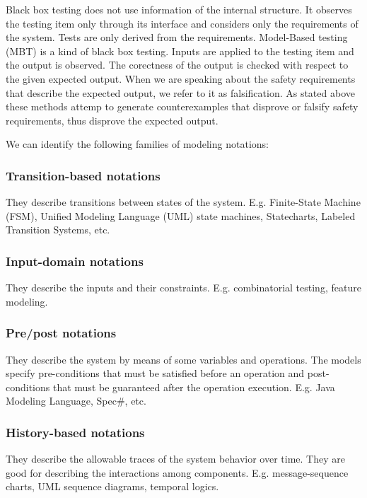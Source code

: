 Black box testing does not use information of the internal structure. It observes the testing item only through its interface and considers only the requirements of the system. Tests are only derived from the requirements. Model-Based testing (MBT) is a kind of black box testing. Inputs are applied to the testing item and the output is observed. The corectness of the output is checked with respect to the given expected output. When we are speaking about the safety requirements that describe the expected output, we refer to it as falsification. As stated above these methods attemp to generate counterexamples that disprove or falsify safety requirements, thus disprove the expected output.

We can identify the following families of modeling notations:

\subsubsection{Transition-based notations}

They describe transitions between states of the system. E.g. Finite-State Machine (FSM), Unified Modeling Language (UML) state machines, Statecharts, Labeled Transition Systems, etc.

\subsubsection{Input-domain notations}

They describe the inputs and their constraints. E.g. combinatorial testing, feature modeling.

\subsubsection{Pre/post notations}

They describe the system by means of some variables and operations. The models specify pre-conditions that must be satisfied before an operation and post-conditions that must be guaranteed after the operation execution. E.g. Java Modeling Language, Spec\#, etc.

\subsubsection{History-based notations}

They describe the allowable traces of the system behavior over time. They are good for describing the interactions among components. E.g. message-sequence charts, UML sequence diagrams, temporal logics.

